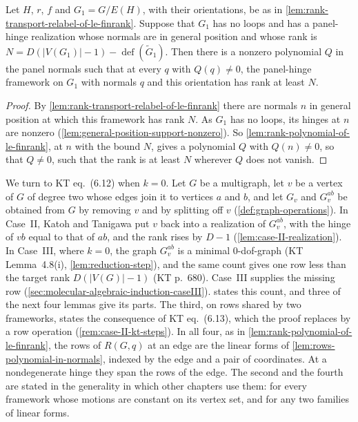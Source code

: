 \begin{lemma}
  \label{lem:rank-polynomial-IH-relabel}
  \leanok
  Let $H$, $r$, $f$ and $G_1 = G/E(H)$, with their orientations, be as in
  \cref{lem:rank-transport-relabel-of-le-finrank}. Suppose that $G_1$ has
  no loops and has a panel-hinge realization whose normals are in general
  position and whose rank is
  $N = D(|V(G_1)|-1) - \operatorname{def}(\tilde G_1)$. Then there is a
  nonzero polynomial $Q$ in the panel normals such that at every $q$ with
  $Q(q) \neq 0$, the panel-hinge framework on $G_1$ with normals $q$ and
  this orientation has rank at least $N$.
\end{lemma}
\begin{proof}
  \leanok
  By \cref{lem:rank-transport-relabel-of-le-finrank} there are normals $n$
  in general position at which this framework has rank $N$. As $G_1$ has
  no loops, its hinges at $n$ are nonzero
  (\cref{lem:general-position-support-nonzero}). So
  \cref{lem:rank-polynomial-of-le-finrank}, at $n$ with the bound $N$,
  gives a polynomial $Q$ with $Q(n) \neq 0$, so that $Q \neq 0$, such that
  the rank is at least $N$ wherever $Q$ does not vanish.
\end{proof}

We turn to KT eq.~(6.12) when $k = 0$. Let $G$ be a multigraph, let $v$
be a vertex of $G$ of degree two whose edges join it to vertices $a$ and
$b$, and let $G_v$ and $G_v^{ab}$ be obtained from $G$ by removing $v$ and
by splitting off $v$ (\cref{def:graph-operations}). In Case~II, Katoh and
Tanigawa put $v$ back into a realization of $G_v^{ab}$, with the hinge of
$vb$ equal to that of $ab$, and the rank rises by $D - 1$
(\cref{lem:case-II-realization}). In Case~III, where $k = 0$, the graph
$G_v^{ab}$ is a minimal $0$-dof-graph (KT Lemma~4.8(i),
\cref{lem:reduction-step}), and the same count gives one row less than
the target rank $D(|V(G)| - 1)$ (KT p.~680). Case~III supplies the
missing row (\cref{sec:molecular-algebraic-induction-caseIII}).
 states this count, and three of
the next four lemmas give its parts. The third, on rows shared by two
frameworks, states the consequence of KT eq.~(6.13), which the proof
replaces by a row operation (\cref{rem:case-II-kt-steps}). In all four, as in
\cref{lem:rank-polynomial-of-le-finrank}, the rows of $R(G,q)$ at an
edge are the linear forms of \cref{lem:rows-polynomial-in-normals},
indexed by the edge and a pair of coordinates. At a nondegenerate hinge
they span the rows of the edge. The second and the fourth are stated in
the generality in which other chapters use them: for every framework
whose motions are constant on its vertex set, and for any two families
of linear forms.

